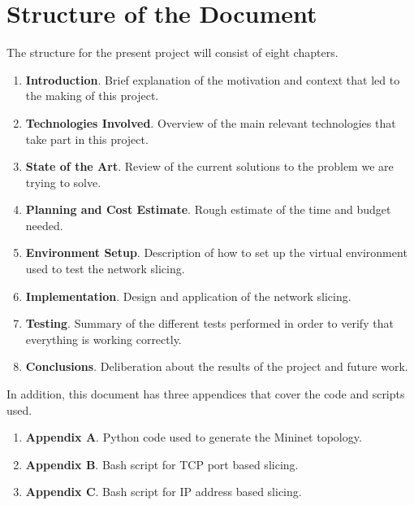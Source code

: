 \section{Structure of the Document}
The structure for the present project will consist of eight chapters.
\begin{enumerate}
    \item \textbf{Introduction}. Brief explanation of the motivation and context that led to the making of this project.
    \item \textbf{Technologies Involved}. Overview of the main relevant technologies that take part in this project.
    \item \textbf{State of the Art}. Review of the current solutions to the problem we are trying to solve.
    \item \textbf{Planning and Cost Estimate}. Rough estimate of the time and budget needed.
    \item \textbf{Environment Setup}. Description of how to set up the virtual environment used to test the network slicing.
    \item \textbf{Implementation}. Design and application of the network slicing.
    \item \textbf{Testing}. Summary of the different tests performed in order to verify that everything is working correctly.
    \item \textbf{Conclusions}. Deliberation about the results of the project and future work.
\end{enumerate}

In addition, this document has three appendices that cover the code and scripts used.
\begin{enumerate}
    \item \textbf{Appendix A}. Python code used to generate the Mininet topology.
    \item \textbf{Appendix B}. Bash script for TCP port based slicing.
    \item \textbf{Appendix C}. Bash script for IP address based slicing.
\end{enumerate}